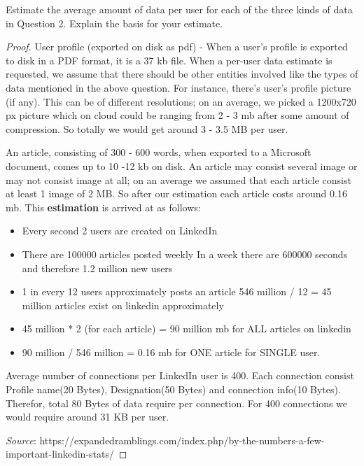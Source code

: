 \documentclass[12pt]{article}
\newenvironment{problem}[2][Problem]{\begin{trivlist}
\item[\hskip \labelsep {\bfseries #1}\hskip \labelsep {\bfseries #2.}]}{\end{trivlist}}
\begin{document}
\begin{problem}{3}
Estimate the average amount of data per user for each of the three kinds of data in Question 2. Explain the basis for your estimate.
\end{problem}
\begin{proof}
User profile (exported on disk as pdf) - When a user’s profile is exported to disk in a PDF format, it is a 37 kb file. When a per-user data estimate is requested, we assume that there should be other entities involved like the types of data mentioned in the above question. For instance, there’s user’s profile picture (if any). This can be of different resolutions; on an average, we picked a 1200x720 px picture which on cloud could be ranging from 2 - 3 mb after some amount of compression. So totally we would get around 3 - 3.5 MB per user.

An article, consisting of 300 - 600 words, when exported to a Microsoft document, comes up to 10 -12 kb on disk. An article may consist several image or may not consist image at all; on an average we assumed that each article consist at least 1 image of 2 MB. So after our estimation each article costs around  0.16 mb. This \textbf{estimation} is arrived at as follows:
{\begin{itemize}
\item Every second 2 users are created on LinkedIn
\item There are 100000 articles posted weekly
In a week there are 600000 seconds and therefore 1.2 million new users
\item 1 in every 12 users approximately posts an article
546 million / 12 = 45 million articles exist on linkedin approximately
\item 45 million * 2 (for each article) = 90 million mb for ALL articles on linkedin
\item 90 million / 546 million = 0.16 mb for ONE article for SINGLE user.
\end{itemize}}
Average number of connections per LinkedIn user is 400. Each connection consist Profile name(20 Bytes), Designation(50 Bytes) and connection info(10 Bytes). Therefor, total 80 Bytes of data require per connection. For 400 connections we would require around 31 KB per user. 

\textit{Source}: https://expandedramblings.com/index.php/by-the-numbers-a-few-important-linkedin-stats/

\end{proof}
\end{document}
